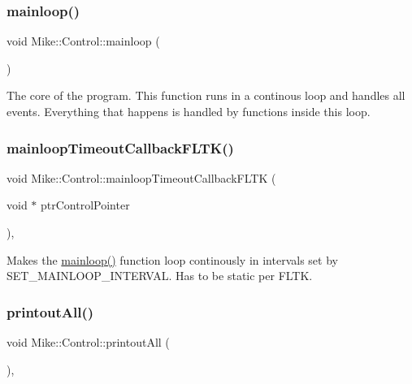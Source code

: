 \subsubsection{\texorpdfstring{mainloop()}{mainloop()}}
{\footnotesize\ttfamily void Mike\+::\+Control\+::mainloop (\begin{DoxyParamCaption}{ }\end{DoxyParamCaption})\hspace{0.3cm}{\ttfamily [private]}}

The core of the program. This function runs in a continous loop and handles all events. Everything that happens is handled by functions inside this loop. \mbox{\label{class_mike_1_1_control_ac627d3cc73f39181fbfabfa01eb47f85}} 
\subsubsection{\texorpdfstring{mainloop\+Timeout\+Callback\+F\+L\+T\+K()}{mainloopTimeoutCallbackFLTK()}}
{\footnotesize\ttfamily void Mike\+::\+Control\+::mainloop\+Timeout\+Callback\+F\+L\+TK (\begin{DoxyParamCaption}\item[{void $\ast$}]{ptr\+Control\+Pointer }\end{DoxyParamCaption})\hspace{0.3cm}{\ttfamily [static]}, {\ttfamily [private]}}

Makes the \hyperlink{class_mike_1_1_control_a3440083f03f7da3d4490fa44bc13d62b}{mainloop()} function loop continously in intervals set by S\+E\+T\+\_\+\+M\+A\+I\+N\+L\+O\+O\+P\+\_\+\+I\+N\+T\+E\+R\+V\+AL. Has to be static per F\+L\+TK. \mbox{\label{class_mike_1_1_control_a2f239c6bace6fba6d31d54919b7ee6e1}} 
\subsubsection{\texorpdfstring{printout\+All()}{printoutAll()}}
{\footnotesize\ttfamily void Mike\+::\+Control\+::printout\+All (\begin{DoxyParamCaption}{ }\end{DoxyParamCaption})\hspace{0.3cm}{\ttfamily [inline]}, {\ttfamily [private]}}

